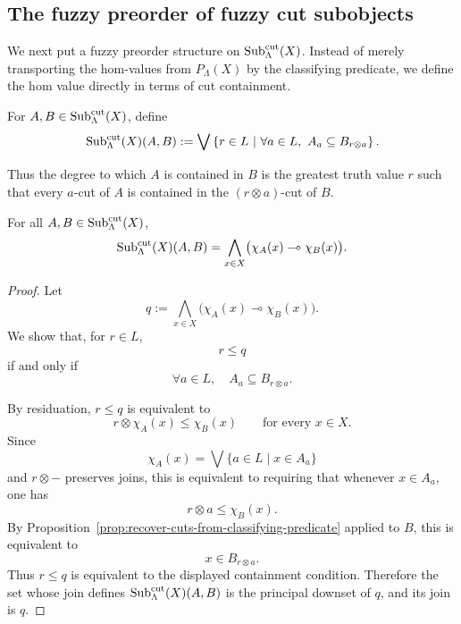 \subsection{The fuzzy preorder of fuzzy cut subobjects}
\label{subsec:fuzzy-preorder-of-fuzzy-cut-subobjects}

We next put a fuzzy preorder structure on \(\mathrm{Sub}^{\mathrm{cut}}_\Lambda(X)\). Instead of merely transporting the hom-values from \(P_\Lambda(X)\) by the classifying predicate, we define the hom value directly in terms of cut containment.

\begin{definition}
\label{def:fuzzy-preorder-on-subobjects}
    For \(A,B\in\mathrm{Sub}^{\mathrm{cut}}_\Lambda(X)\), define
    \[
        \mathrm{Sub}^{\mathrm{cut}}_\Lambda(X)(A,B)
        :=
        \bigvee
        \left\{
            r\in L
            \ \middle|\
            \forall a\in L,\
            A_a\subseteq B_{r\otimes a}
        \right\}.
    \]
\end{definition}

Thus the degree to which \(A\) is contained in \(B\) is the greatest truth value \(r\) such that every \(a\)-cut of \(A\) is contained in the \((r\otimes a)\)-cut of \(B\).

\begin{lemma}
\label{lem:subobject-hom-equals-classifier-hom}
    For all \(A,B\in\mathrm{Sub}^{\mathrm{cut}}_\Lambda(X)\),
    \[
        \mathrm{Sub}^{\mathrm{cut}}_\Lambda(X)(A,B)
        =
        \bigwedge_{x\in X}
        \bigl(\chi_A(x)\multimap\chi_B(x)\bigr).
    \]
\end{lemma}

\begin{proof}
    Let
    \[
        q:=
        \bigwedge_{x\in X}
        \bigl(\chi_A(x)\multimap\chi_B(x)\bigr).
    \]
    We show that, for \(r\in L\),
    \[
        r\leq q
    \]
    if and only if
    \[
        \forall a\in L,\quad A_a\subseteq B_{r\otimes a}.
    \]

    By residuation, \(r\leq q\) is equivalent to
    \[
        r\otimes\chi_A(x)\leq\chi_B(x)
        \qquad
        \text{for every }x\in X.
    \]
    Since
    \[
        \chi_A(x)=\bigvee\{a\in L\mid x\in A_a\}
    \]
    and \(r\otimes-\) preserves joins, this is equivalent to requiring that whenever \(x\in A_a\), one has
    \[
        r\otimes a\leq\chi_B(x).
    \]
    By Proposition~\ref{prop:recover-cuts-from-classifying-predicate} applied to \(B\), this is equivalent to
    \[
        x\in B_{r\otimes a}.
    \]
    Thus \(r\leq q\) is equivalent to the displayed containment condition. Therefore the set whose join defines \(\mathrm{Sub}^{\mathrm{cut}}_\Lambda(X)(A,B)\) is the principal downset of \(q\), and its join is \(q\).
\end{proof}

